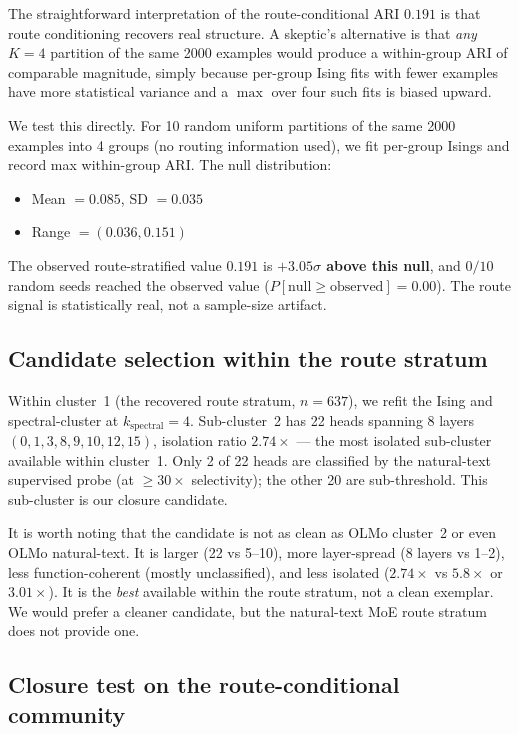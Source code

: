 \documentclass[11pt]{article}
\begin{document}
The straightforward interpretation of the route-conditional ARI $0.191$
is that route conditioning recovers real structure. A skeptic's
alternative is that \emph{any} $K=4$ partition of the same 2000 examples
would produce a within-group ARI of comparable magnitude, simply because
per-group Ising fits with fewer examples have more statistical variance
and a $\max$ over four such fits is biased upward.

We test this directly. For 10 random uniform partitions of the same 2000
examples into 4 groups (no routing information used), we fit per-group
Isings and record max within-group ARI. The null distribution:

\begin{itemize}
\item Mean $= 0.085$, SD $= 0.035$
\item Range $= (0.036, 0.151)$
\end{itemize}

The observed route-stratified value $0.191$ is \textbf{$+3.05\sigma$ above
this null}, and $0/10$ random seeds reached the observed value
($P[\text{null} \geq \text{observed}] = 0.00$). The route signal is
statistically real, not a sample-size artifact.

\subsection{Candidate selection within the route stratum}
Within cluster~1 (the recovered route stratum, $n = 637$), we refit the
Ising and spectral-cluster at $k_{\text{spectral}} = 4$. Sub-cluster~2 has
22 heads spanning 8 layers $(0, 1, 3, 8, 9, 10, 12, 15)$, isolation ratio
$2.74\times$ --- the most isolated sub-cluster available within
cluster~1. Only 2 of 22 heads are classified by the natural-text
supervised probe (at $\geq 30\times$ selectivity); the other 20 are
sub-threshold. This sub-cluster is our closure candidate.

It is worth noting that the candidate is not as clean as OLMo cluster~2
or even OLMo natural-text. It is larger (22 vs 5--10), more layer-spread
(8 layers vs 1--2), less function-coherent (mostly unclassified), and
less isolated ($2.74\times$ vs $5.8\times$ or $3.01\times$). It is the
\emph{best} available within the route stratum, not a clean exemplar. We
would prefer a cleaner candidate, but the natural-text MoE route stratum
does not provide one.

\subsection{Closure test on the route-conditional community}
\label{sec:moe-closure}
\end{document}
